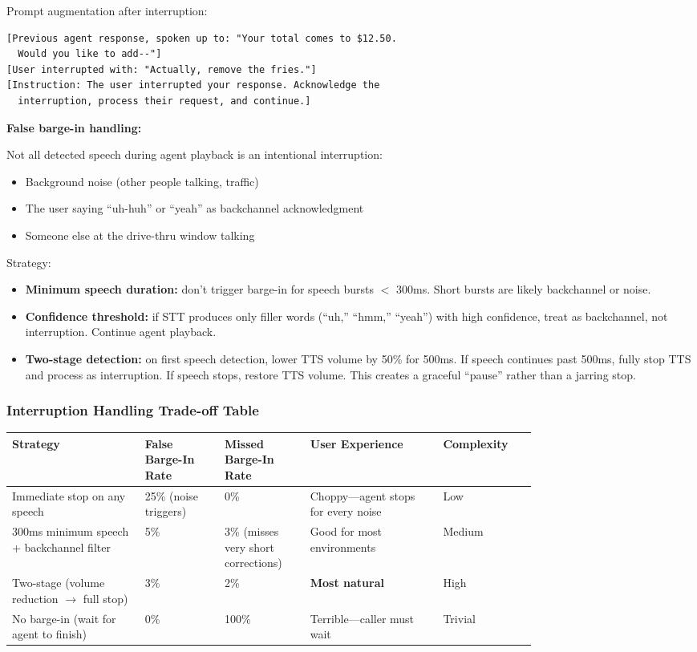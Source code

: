 Prompt augmentation after interruption:
\begin{verbatim}
[Previous agent response, spoken up to: "Your total comes to $12.50.
  Would you like to add--"]
[User interrupted with: "Actually, remove the fries."]
[Instruction: The user interrupted your response. Acknowledge the
  interruption, process their request, and continue.]
\end{verbatim}

\textbf{False barge-in handling:}

Not all detected speech during agent playback is an intentional interruption:
\begin{itemize}
  \item Background noise (other people talking, traffic)
  \item The user saying ``uh-huh'' or ``yeah'' as backchannel acknowledgment
  \item Someone else at the drive-thru window talking
\end{itemize}

Strategy:
\begin{itemize}
  \item \textbf{Minimum speech duration:} don't trigger barge-in for speech bursts $<$ 300ms. Short bursts are likely backchannel or noise.
  \item \textbf{Confidence threshold:} if STT produces only filler words (``uh,'' ``hmm,'' ``yeah'') with high confidence, treat as backchannel, not interruption. Continue agent playback.
  \item \textbf{Two-stage detection:} on first speech detection, lower TTS volume by 50\% for 500ms. If speech continues past 500ms, fully stop TTS and process as interruption. If speech stops, restore TTS volume. This creates a graceful ``pause'' rather than a jarring stop.
\end{itemize}

\subsubsection*{Interruption Handling Trade-off Table}

\begin{tabular}{|p{0.2\linewidth}|p{0.12\linewidth}|p{0.12\linewidth}|p{0.2\linewidth}|p{0.12\linewidth}|}
\hline
\textbf{Strategy} & \textbf{False Barge-In Rate} & \textbf{Missed Barge-In Rate} & \textbf{User Experience} & \textbf{Complexity} \\
\hline
Immediate stop on any speech & 25\% (noise triggers) & 0\% & Choppy---agent stops for every noise & Low \\
\hline
300ms minimum speech + backchannel filter & 5\% & 3\% (misses very short corrections) & Good for most environments & Medium \\
\hline
Two-stage (volume reduction $\rightarrow$ full stop) & 3\% & 2\% & \textbf{Most natural} & High \\
\hline
No barge-in (wait for agent to finish) & 0\% & 100\% & Terrible---caller must wait & Trivial \\
\hline
\end{tabular}

